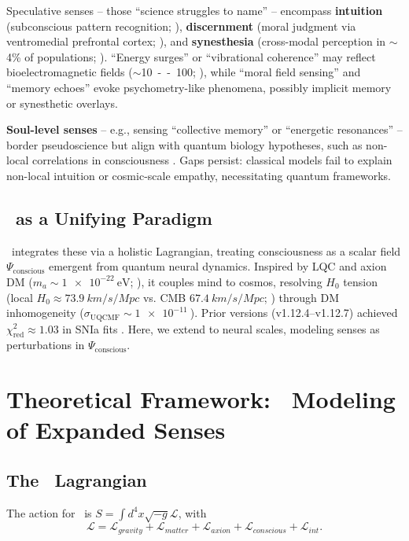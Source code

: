 \documentclass[11pt,a4paper,preprint]{article}
\newcommand{\uqcmf}{\mathrm{UQCMF}}
\newcommand{\Psicon}{\Psi_{\mathrm{conscious}}}
\newcommand{\La}{\mathcal{L}}
\newcommand{\sigU}{\sigma_{\uqcmf}}
\begin{document}
Speculative senses -- those ``science struggles to name'' -- encompass \textbf{intuition} (subconscious pattern recognition; \citealt{kahneman2011}), \textbf{discernment} (moral judgment via ventromedial prefrontal cortex; \citealt{greene2013}), and \textbf{synesthesia} (cross-modal perception in $\sim$4\% of populations; \citealt{ramachandran2001}). ``Energy surges'' or ``vibrational coherence'' may reflect bioelectromagnetic fields ($\sim$\SI{10}{--100}{\micro\volt}; \citealt{mccraty2015}), while ``moral field sensing'' and ``memory echoes'' evoke psychometry-like phenomena, possibly implicit memory or synesthetic overlays.

\textbf{Soul-level senses} -- e.g., sensing ``collective memory'' or ``energetic resonances'' -- border pseudoscience but align with quantum biology hypotheses, such as non-local correlations in consciousness \citep{hameroff2014}. Gaps persist: classical models fail to explain non-local intuition or cosmic-scale empathy, necessitating quantum frameworks.

\subsection{\uqcmf\ as a Unifying Paradigm}

\uqcmf\ integrates these via a holistic Lagrangian, treating consciousness as a scalar field $\Psicon$ emergent from quantum neural dynamics. Inspired by LQC \citep{ashtekar2011} and axion DM ($m_a \sim \SI{1e-22}{\electronvolt}$; \citealt{sikivie2009}), it couples mind to cosmos, resolving $H_0$ tension (local $H_0 \approx \SI{73.9}{km/s/Mpc}$ vs. CMB $\SI{67.4}{km/s/Mpc}$; \citealt{riess2022}) through DM inhomogeneity ($\sigU \sim \SI{1e-11}{}$). Prior versions (v1.12.4--v1.12.7) achieved $\chi^2_{\mathrm{red}} \approx 1.03$ in SNIa fits \citep{heidari2025b}. Here, we extend to neural scales, modeling senses as perturbations in $\Psicon$.

\section{Theoretical Framework: \uqcmf\ Modeling of Expanded Senses}\label{sec:theory}

\subsection{The \uqcmf\ Lagrangian}

The action for \uqcmf\ is $S = \int d^4x \sqrt{-g} \La$, with
\begin{equation}
    \La = \La_{gravity} + \La_{matter} + \La_{axion} + \La_{conscious} + \La_{int}.
    \label{eq:lagrangian}
\end{equation}
\end{document}
